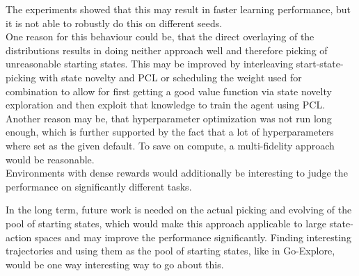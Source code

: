 \documentclass{article}
\begin{document}
The experiments showed that this may result in faster learning performance, but it is not able to robustly do this on different seeds. \\
One reason for this behaviour could be, that the direct overlaying of the distributions results in doing neither approach well and therefore picking of unreasonable starting states. This may be improved by interleaving start-state-picking with state novelty and PCL or scheduling the weight used for combination to allow for first getting a good value function via state novelty exploration and then exploit that knowledge to train the agent using PCL. \\
Another reason may be, that hyperparameter optimization was not run long enough, which is further supported by the fact that a lot of hyperparameters where set as the given default. To save on compute, a multi-fidelity approach would be reasonable. \\
Environments with dense rewards would additionally be interesting to judge the performance on significantly different tasks.

In the long term, future work is needed on the actual picking and evolving of the pool of starting states, which would make this approach applicable to large state-action spaces and may improve the performance significantly. Finding interesting trajectories and using them as the pool of starting states, like in Go-Explore, would be one way interesting way to go about this.



\newpage



\newpage
\end{document}
